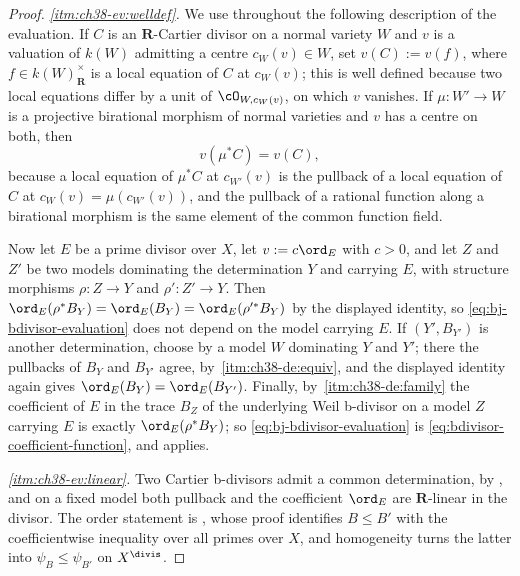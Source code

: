 \begin{proof}
\emph{\cref{itm:ch38-ev:welldef}.}  We use throughout the following
description of the evaluation.  If $C$ is an $\mathbf R$-Cartier
divisor on a normal variety $W$ and $v$ is a valuation of $k(W)$
admitting a centre $c_W(v)\in W$, set
$v(C):=v(f)$, where $f\in k(W)^\times_{\mathbf R}$ is a local equation
of $C$ at $c_W(v)$; this is well defined because two local equations
differ by a unit of $\cO_{W,c_W(v)}$, on which $v$ vanishes.  If
$\mu:W'\to W$ is a projective birational morphism of normal varieties and
$v$ has a centre on both, then
\begin{equation*}
 v(\mu^*C)=v(C),
\end{equation*}
because a local equation of $\mu^*C$ at $c_{W'}(v)$ is the pullback of
a local equation of $C$ at $c_W(v)=\mu(c_{W'}(v))$, and the pullback of
a rational function along a birational morphism is the same element of the
common function field.

Now let $E$ be a prime divisor over $X$, let $v:=c\ord_E$ with
$c>0$, and let $Z$ and $Z'$ be two models dominating the
determination $Y$ and carrying $E$, with structure morphisms
$\rho:Z\to Y$ and $\rho':Z'\to Y$.  Then
$\ord_E(\rho^*B_Y)=\ord_E(B_Y)=\ord_E(\rho'^*B_Y)$ by the displayed
identity, so \eqref{eq:bj-bdivisor-evaluation} does not depend on the model
carrying $E$.  If $(Y',B_{Y'})$ is another determination, choose by
 a model $W$ dominating $Y$ and
$Y'$; there the pullbacks of $B_Y$ and $B_{Y'}$ agree, by
\,\cref{itm:ch38-de:equiv}, and the
displayed identity again gives $\ord_E(B_Y)=\ord_E(B_{Y'})$.  Finally, by
\,\cref{itm:ch38-de:family} the
coefficient of $E$ in the trace $B_Z$ of the underlying Weil b-divisor
on a model $Z$ carrying $E$ is exactly
$\ord_E(\rho^*B_Y)$; so \eqref{eq:bj-bdivisor-evaluation} is
\eqref{eq:bdivisor-coefficient-function}, and
 applies.

\emph{\cref{itm:ch38-ev:linear}.}  Two Cartier b-divisors admit a common
determination, by , and on a fixed model
both pullback and the coefficient $\ord_E$ are $\mathbf R$-linear in
the divisor.  The order statement is
, whose proof identifies
$B\leq B'$ with the coefficientwise inequality over all primes over
$X$, and homogeneity turns the latter into
$\psi_B\leq\psi_{B'}$ on $X^{\divis}$.


\end{proof}
